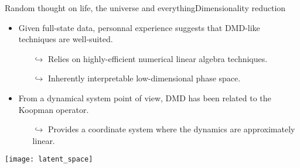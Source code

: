 \begin{frame}[t, c]{Random thought on life, the universe and everything}{Dimensionality reduction}
  \begin{minipage}{.68\textwidth}
    \begin{itemize}
    \item Given full-state data, personnal experience suggests that DMD-like techniques are well-suited.
      \begin{itemize}
      \item[\(	\hookrightarrow	\)] Relies on highly-efficient numerical linear algebra techniques.
      \item[\(	\hookrightarrow	\)] Inherently interpretable low-dimensional phase space.
      \end{itemize}
      
      \medskip
      
    \item From a dynamical system point of view, DMD has been related to the Koopman operator.
      \begin{itemize}
      \item[\(	\hookrightarrow	\)] Provides a coordinate system where the dynamics are approximately linear.
      \end{itemize}
    \end{itemize}
  \end{minipage}%
  \hfill
  \begin{minipage}{.28\textwidth}
    \centering
    \texttt{[image: latent\_space]}
  \end{minipage}
  
  \vspace{1cm}
\end{frame}

